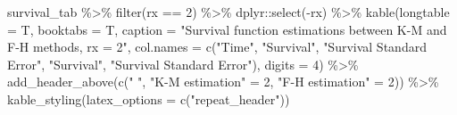 \documentclass[
]{article}
\newenvironment{Shaded}{\begin{snugshade}}{\end{snugshade}}
\newcommand{\AttributeTok}[1]{\textcolor[rgb]{0.77,0.63,0.00}{#1}}
\newcommand{\DecValTok}[1]{\textcolor[rgb]{0.00,0.00,0.81}{#1}}
\newcommand{\FunctionTok}[1]{\textcolor[rgb]{0.00,0.00,0.00}{#1}}
\newcommand{\NormalTok}[1]{#1}
\newcommand{\OtherTok}[1]{\textcolor[rgb]{0.56,0.35,0.01}{#1}}
\newcommand{\SpecialCharTok}[1]{\textcolor[rgb]{0.00,0.00,0.00}{#1}}
\newcommand{\StringTok}[1]{\textcolor[rgb]{0.31,0.60,0.02}{#1}}
\begin{document}
\begin{Shaded}
\begin{Highlighting}[]
\NormalTok{survival\_tab }\SpecialCharTok{\%\textgreater{}\%} \FunctionTok{filter}\NormalTok{(rx }\SpecialCharTok{==} \DecValTok{2}\NormalTok{) }\SpecialCharTok{\%\textgreater{}\%}\NormalTok{ dplyr}\SpecialCharTok{::}\FunctionTok{select}\NormalTok{(}\SpecialCharTok{{-}}\NormalTok{rx) }\SpecialCharTok{\%\textgreater{}\%} \FunctionTok{kable}\NormalTok{(}\AttributeTok{longtable =}\NormalTok{ T, }\AttributeTok{booktabs =}\NormalTok{ T, }\AttributeTok{caption =} \StringTok{"Survival function estimations between K{-}M and F{-}H methods, rx = 2"}\NormalTok{, }\AttributeTok{col.names =} \FunctionTok{c}\NormalTok{(}\StringTok{"Time"}\NormalTok{, }\StringTok{"Survival"}\NormalTok{, }\StringTok{"Survival Standard Error"}\NormalTok{, }\StringTok{"Survival"}\NormalTok{, }\StringTok{"Survival Standard Error"}\NormalTok{), }\AttributeTok{digits =} \DecValTok{4}\NormalTok{) }\SpecialCharTok{\%\textgreater{}\%} \FunctionTok{add\_header\_above}\NormalTok{(}\FunctionTok{c}\NormalTok{(}\StringTok{" "}\NormalTok{, }\StringTok{"K{-}M estimation"} \OtherTok{=} \DecValTok{2}\NormalTok{, }\StringTok{"F{-}H estimation"} \OtherTok{=} \DecValTok{2}\NormalTok{)) }\SpecialCharTok{\%\textgreater{}\%} \FunctionTok{kable\_styling}\NormalTok{(}\AttributeTok{latex\_options =} \FunctionTok{c}\NormalTok{(}\StringTok{"repeat\_header"}\NormalTok{))}
\end{Highlighting}
\end{Shaded}
\end{document}
